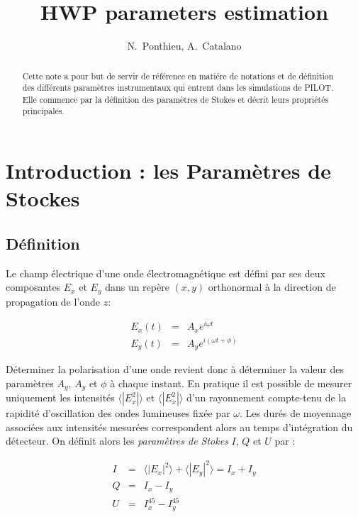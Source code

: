 \documentclass[a4paper,10pt]{article}
\title{HWP parameters estimation}
\author{N.~Ponthieu, A.~Catalano}
\begin{document}
\maketitle
\tableofcontents

\begin{abstract}
Cette note a pour but de servir de r\'ef\'erence en mati\'ere de
notations et de d\'efinition des diff\'erents param\`etres
instrumentaux qui entrent dans les simulations de PILOT. Elle
commence par la d\'efinition des param\`etres de Stokes et
d\'ecrit leurs propri\'et\'es principales.
\end{abstract}

\section{Introduction : les Param\`{e}tres de Stockes}

\subsection{D\'efinition}

Le champ \'{e}lectrique d'une onde \'{e}lectromagn\'{e}tique est
d\'{e}fini par ses deux composantes $E_{x}$ et $E_{y}$ dans un
rep\`{e}re $(x,y)$ orthonormal \`{a} la direction de propagation
de l'onde $z$:

\begin{eqnarray}
E_x(t) & = & A_xe^{i\omega t} \nonumber \\
E_y(t) & = & A_ye^{i(\omega t+\phi)}
\end{eqnarray}

D\'{e}terminer la polarisation d'une onde revient donc \`{a}
d\'{e}terminer la valeur des param\`{e}tres $A_y$, $A_y$ et $\phi$
\`{a} chaque instant. En pratique il est possible de mesurer
uniquement les intensit\'{e}s $\langle |E_{x}^{2}|\rangle$ et
$\langle |E_{x}^{2}|\rangle$ d'un rayonnement compte-tenu de la
rapidit\'{e} d'oscillation des ondes lumineuses fix\'{e}e par
$\omega$. Les dur\'{e}s de moyennage associ\'{e}es aux
intensit\'{e}s mesur\'{e}es correspondent alors au temps
d'int\'{e}gration du d\'{e}tecteur. On d\'efinit alors les
\emph{param\`{e}tres de Stokes} $I$, $Q$ et $U$ par :

\begin{eqnarray}
I & = & \langle |E_{x}|^2\rangle+\langle|E_y|^2\rangle=I_x + I_y \\
Q & = & I_x-I_y \\
U & = & I_{x}^{45}-I_{y}^{45}
\end{eqnarray}
\end{document}
